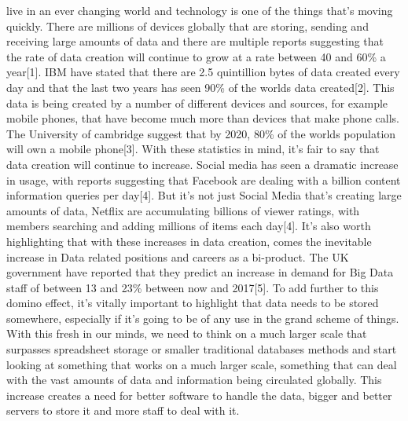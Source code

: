 \documentclass[10pt,journal,compsoc]{IEEEtran}
\begin{document}
 live in an ever changing world and technology is one of the things that's moving quickly. There are millions of devices globally that are storing, sending and receiving large amounts of data and there are multiple reports suggesting that the rate of data creation will continue to grow at a rate between 40 and 60\% a year[1]. IBM have stated that there are 2.5 quintillion bytes of data created every day and that the last two years has seen 90\% of the worlds data created[2]. This data is being created by a number of different devices and sources, for example mobile phones, that have become much more than devices that make phone calls. The University of cambridge suggest that by 2020, 80\% of the worlds population will own a mobile phone[3]. With these statistics in mind, it's fair to say that data creation will continue to increase. Social media has seen a dramatic increase in usage, with reports suggesting that Facebook are dealing with a billion content information queries per day[4]. But it's not just Social Media that's creating large amounts of data, Netflix are accumulating billions of viewer ratings, with members searching and adding millions of items each day[4]. It's also worth highlighting that with these increases in data creation, comes the inevitable increase in Data related positions and careers as a bi-product. The UK government have reported that they predict an increase in demand for Big Data staff of between 13 and 23\% between now and 2017[5]. To add further to this domino effect, it's vitally important to highlight that data needs to be stored somewhere, especially if it's going to be of any use in the grand scheme of things. With this fresh in our minds, we need to think on a much larger scale that surpasses spreadsheet storage or smaller traditional databases methods and start looking at something that works on a much larger scale, something that can deal with the vast amounts of data and information being circulated globally. This increase creates a need for better software to handle the data, bigger and better servers to store it and more staff to deal with it. 
\end{document}
